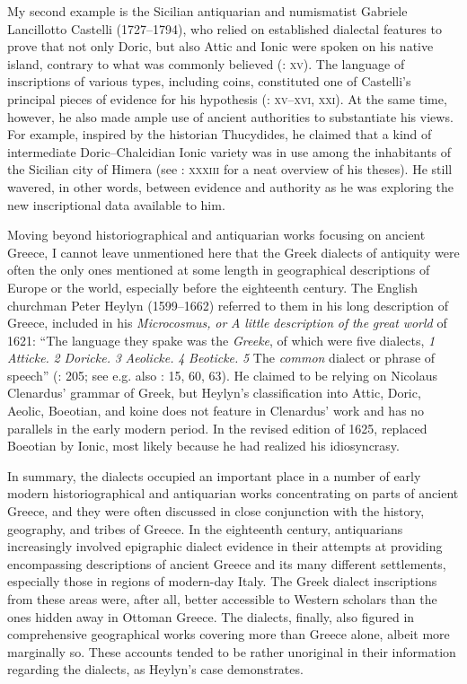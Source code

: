My second example is the Sicilian antiquarian and numismatist Gabriele Lancillotto Castelli (1727–1794), who relied on established dialectal features to prove that not only Doric, but also Attic and Ionic were spoken on his native island, contrary to what was commonly believed (\citealt{Castelli1769}: \textsc{xv}). The language of inscriptions of various types, including coins, constituted one of Castelli’s principal pieces of evidence for his hypothesis (\citealt{Castelli1769}: \textsc{xv–xvi,} \textsc{xxi}). At the same time, however, he also made ample use of ancient authorities to substantiate his views. For example, inspired by the historian Thucydides, he claimed that a kind of intermediate Doric–Chalcidian Ionic variety was in use among the inhabitants of the Sicilian city of Himera (see \citealt{Castelli1769}: \textsc{xxxiii} for a neat overview of his theses). He still wavered, in other words, between evidence and authority as he was exploring the new inscriptional data available to him.

Moving beyond historiographical and antiquarian works focusing on ancient Greece, I cannot leave unmentioned here that the Greek dialects of antiquity were often the only ones mentioned at some length in geographical descriptions of Europe or the world, especially before the eighteenth century. The English churchman Peter Heylyn (1599–1662) referred to them in his long description of Greece, included in his \textit{Microcosmus,} \textit{or} \textit{A} \textit{little} \textit{description} \textit{of} \textit{the} \textit{great} \textit{world} of 1621: “The language they spake was the \textit{Greeke}, of which were five dialects, \textit{1} \textit{Atticke.} \textit{2} \textit{Doricke.} \textit{3} \textit{Aeolicke.} \textit{4} \textit{Beoticke.} \textit{5} The \textit{common} dialect or phrase of speech” (\citealt{Heylyn1621}: 205; see e.g. also \citealt{Speed1676}: 15, 60, 63). He claimed to be relying on Nicolaus Clenardus’ grammar of Greek, but Heylyn’s classification into Attic, Doric, Aeolic, Boeotian, and koine does not feature in Clenardus’ work and has no parallels in the early modern period. In the revised edition of 1625, \citet[375]{Heylyn1625} replaced Boeotian by Ionic, most likely because he had realized his idiosyncrasy.

In summary, the dialects occupied an important place in a number of early modern historiographical and antiquarian works concentrating on parts of ancient Greece, and they were often discussed in close conjunction with the history, geography, and tribes of Greece. In the eighteenth century, antiquarians increasingly involved epigraphic dialect evidence in their attempts at providing encompassing descriptions of ancient Greece and its many different settlements, especially those in regions of modern-day Italy. The Greek dialect inscriptions from these areas were, after all, better accessible to Western scholars than the ones hidden away in Ottoman Greece. The dialects, finally, also figured in comprehensive geographical works covering more than Greece alone, albeit more marginally so. These accounts tended to be rather unoriginal in their information regarding the dialects, as Heylyn’s case demonstrates.

